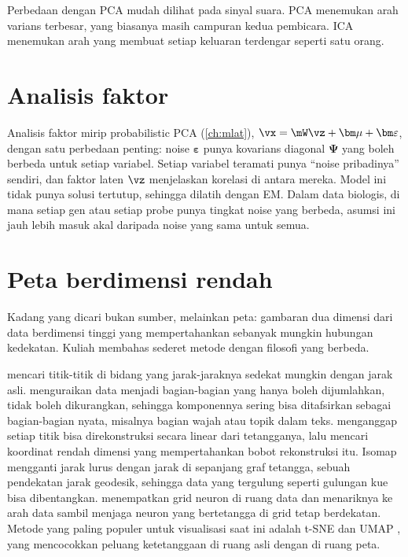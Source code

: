 Perbedaan dengan PCA mudah dilihat pada sinyal suara. PCA menemukan arah varians terbesar, yang
biasanya masih campuran kedua pembicara. ICA menemukan arah yang membuat setiap keluaran terdengar
seperti satu orang.

\section{Analisis faktor}

Analisis faktor mirip probabilistic PCA (\cref{ch:mlat}), $\vx=\mW\vz+\bm\mu+\bm\varepsilon$, dengan
satu perbedaan penting: noise $\bm\varepsilon$ punya kovarians diagonal $\bm\Psi$ yang boleh berbeda
untuk setiap variabel. Setiap variabel teramati punya ``noise pribadinya'' sendiri, dan faktor
laten $\vz$ menjelaskan korelasi di antara mereka. Model ini tidak punya solusi tertutup, sehingga
dilatih dengan EM. Dalam data biologis, di mana setiap gen atau setiap probe punya tingkat noise
yang berbeda, asumsi ini jauh lebih masuk akal daripada noise yang sama untuk semua.

\section{Peta berdimensi rendah}

Kadang yang dicari bukan sumber, melainkan peta: gambaran dua dimensi dari data berdimensi tinggi
yang mempertahankan sebanyak mungkin hubungan kedekatan. Kuliah membahas sederet metode dengan
filosofi yang berbeda.

 mencari titik-titik di bidang yang jarak-jaraknya sedekat mungkin
dengan jarak asli.  menguraikan data menjadi bagian-bagian
yang hanya boleh dijumlahkan, tidak boleh dikurangkan, sehingga komponennya sering bisa ditafsirkan
sebagai bagian-bagian nyata, misalnya bagian wajah atau topik dalam teks.  \citep{roweis2000} menganggap setiap titik bisa direkonstruksi secara linear dari
tetangganya, lalu mencari koordinat rendah dimensi yang mempertahankan bobot rekonstruksi itu.
Isomap \citep{tenenbaum2000} mengganti jarak lurus dengan jarak di sepanjang graf tetangga, sebuah
pendekatan jarak geodesik, sehingga data yang tergulung seperti gulungan kue bisa dibentangkan.
 \citep{kohonen1982} menempatkan grid neuron di ruang data dan menariknya
ke arah data sambil menjaga neuron yang bertetangga di grid tetap berdekatan. Metode yang paling
populer untuk visualisasi saat ini adalah t-SNE dan UMAP \citep{mcinnes2018}, yang mencocokkan
peluang ketetanggaan di ruang asli dengan di ruang peta.

